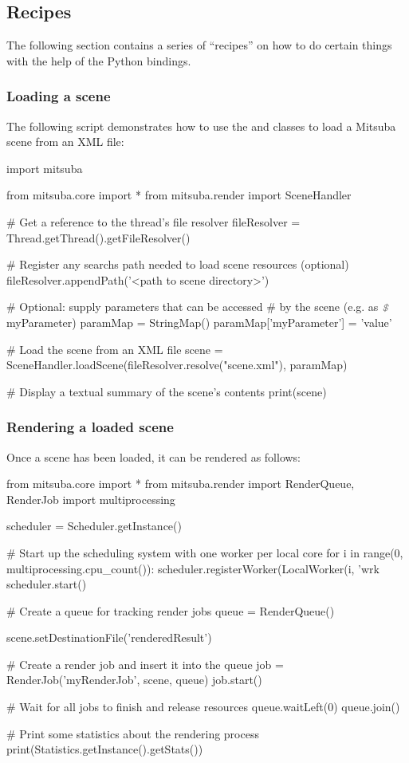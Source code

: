 \subsection{Recipes}
The following section contains a series of ``recipes'' on how to do
certain things with the help of the Python bindings.

\subsubsection{Loading a scene}
The following script demonstrates how to use the
 and  classes to
load a Mitsuba scene from an XML file:
\begin{python}
import mitsuba

from mitsuba.core import *
from mitsuba.render import SceneHandler

# Get a reference to the thread's file resolver
fileResolver = Thread.getThread().getFileResolver()

# Register any searchs path needed to load scene resources (optional)
fileResolver.appendPath('<path to scene directory>')

# Optional: supply parameters that can be accessed
# by the scene (e.g. as $\text{\color{lstcomment}\itshape\texttt{\$}}$myParameter)
paramMap = StringMap()
paramMap['myParameter'] = 'value'

# Load the scene from an XML file
scene = SceneHandler.loadScene(fileResolver.resolve("scene.xml"), paramMap)

# Display a textual summary of the scene's contents
print(scene)
\end{python}

\subsubsection{Rendering a loaded scene}
Once a scene has been loaded, it can be rendered as follows:
\begin{python}
from mitsuba.core import *
from mitsuba.render import RenderQueue, RenderJob
import multiprocessing

scheduler = Scheduler.getInstance()

# Start up the scheduling system with one worker per local core
for i in range(0, multiprocessing.cpu_count()):
    scheduler.registerWorker(LocalWorker(i, 'wrk%
scheduler.start()

# Create a queue for tracking render jobs
queue = RenderQueue()

scene.setDestinationFile('renderedResult')

# Create a render job and insert it into the queue
job = RenderJob('myRenderJob', scene, queue)
job.start()

# Wait for all jobs to finish and release resources
queue.waitLeft(0)
queue.join()

# Print some statistics about the rendering process
print(Statistics.getInstance().getStats())
\end{python}

